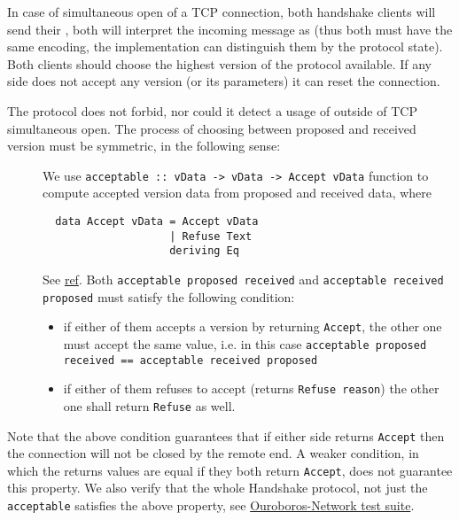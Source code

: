 In case of simultaneous open of a TCP connection, both handshake clients will
send their \MsgProposeVersions{}, both will interpret the incoming message as
\MsgReplyVersions{} (thus both must have the same encoding, the implementation
can distinguish them by the protocol state).  Both clients should choose the
highest version of the protocol available.  If any side does not accept any
version (or its parameters) it can reset the connection.

The protocol does not forbid, nor could it detect a usage of
\MsgReplyVersions{} outside of TCP simultaneous open.  The process of
choosing between proposed and received version must be symmetric, in the
following sense:

\begin{description}
  \item[]
    We use \texttt{acceptable :: vData -> vData -> Accept vData}
    function to compute accepted version data from proposed and received data,
    where
\begin{verbatim}
  data Accept vData = Accept vData
                    | Refuse Text
                    deriving Eq
\end{verbatim}
    See
    \href{https://input-output-hk.github.io/ouroboros-network/ouroboros-network-framework/Ouroboros-Network-Protocol-Handshake-Version.html#t:Acceptable}{ref}.
    Both \texttt{acceptable proposed received} and \texttt{acceptable received
    proposed} must satisfy the following condition:
    \begin{itemize}
      \item if either of them accepts a version by returning \texttt{Accept},
        the other one must accept the same value, i.e. in this case
        \texttt{acceptable proposed received == acceptable received proposed}
      \item if either of them refuses to accept (returns \texttt{Refuse reason})
        the other one shall return \texttt{Refuse} as well.
    \end{itemize}
\end{description}
Note that the above condition guarantees that if either side returns
\texttt{Accept} then the connection will not be closed by the remote end.
A weaker condition, in which the returns values are equal if they both return
\texttt{Accept}, does not guarantee this property.  We also verify that the
whole Handshake protocol, not just the \texttt{acceptable} satisfies the above
property, see
\href{https://github.com/input-output-hk/ouroboros-network/blob/master/ouroboros-network/protocol-tests/Ouroboros/Network/Protocol/Handshake/Test.hs}{Ouroboros-Network
test suite}.

